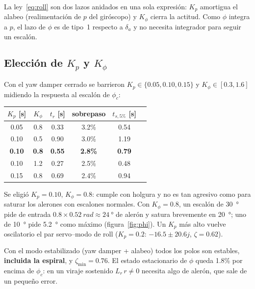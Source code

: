 \documentclass[11pt,a4paper]{article}
\begin{document}
La ley~\eqref{eq:roll} son dos lazos anidados en una sola expresión: $K_p$
amortigua el alabeo (realimentación de $p$ del giróscopo) y $K_\phi$ cierra la
actitud. Como $\phi$ integra a $p$, el lazo de $\phi$ es de tipo~1 respecto a
$\delta_a$ y no necesita integrador para seguir un escalón.

\subsection{Elección de \texorpdfstring{$K_p$ y $K_\phi$}{Kp y Kphi}}

Con el yaw damper cerrado se barrieron $K_p \in \{0.05, 0.10, 0.15\}$ y
$K_\phi \in [0.3, 1.6]$ midiendo la respuesta al escalón de $\phi_c$:

\begin{center}
\begin{tabular}{cccccc}
\toprule
$K_p$ [\si{s}] & $K_\phi$ & $t_r$ [\si{s}] & sobrepaso & $t_{s,5\%}$ [\si{s}] \\
\midrule
0.05 & 0.8 & 0.33 & 3.2\% & 0.54 \\
0.10 & 0.5 & 0.90 & 3.0\% & 1.19 \\
\textbf{0.10} & \textbf{0.8} & \textbf{0.55} & \textbf{2.8\%} & \textbf{0.79} \\
0.10 & 1.2 & 0.27 & 2.5\% & 0.48 \\
0.15 & 0.8 & 0.69 & 2.4\% & 0.94 \\
\bottomrule
\end{tabular}
\end{center}

Se eligió $K_p = 0.10$, $K_\phi = 0.8$: cumple con holgura y no es tan agresivo
como para saturar los alerones con escalones normales. Con $K_\phi = 0.8$, un
escalón de \SI{30}{\degree} pide de entrada
$0.8 \times \SI{0.52}{rad} \approx \SI{24}{\degree}$ de alerón y satura brevemente en
\SI{20}{\degree}; uno de \SI{10}{\degree} pide \SI{5.2}{\degree} como máximo
(figura~\ref{fig:phi}). Un $K_p$ más alto vuelve oscilatorio el par
servo--modo de roll ($K_p = 0.2$: $-16.5 \pm 20.6j$, $\zeta = 0.62$).

Con el modo estabilizado (yaw damper + alabeo) todos los polos son estables,
\textbf{incluida la espiral}, y $\zeta_{\min} = 0.76$. El estado
estacionario de $\phi$ queda 1.8\% por encima de $\phi_c$: en un viraje
sostenido $L_r\,r \ne 0$ necesita algo de alerón, que sale de un pequeño error.
\end{document}
